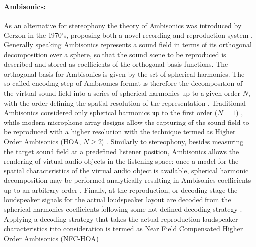 \paragraph{Ambisonics:}
As an alternative for stereophony the theory of Ambisonics was introduced by Gerzon in the 1970's, proposing both a novel recording and reproduction system \cite{gerzon1973periphony}.
Generally speaking Ambisonics represents a sound field in terms of its orthogonal decomposition over a sphere, so that the sound scene to be reproduced is described and stored as coefficients of the orthogonal basis functions.
The orthogonal basis for Ambisonics is given by the set of spherical harmonics.
The so-called encoding step of Ambisonics format is therefore the decomposition of the virtual sound field into a series of spherical harmonics up to a given order $N$, with the order defining the spatial resolution of the representation \cite{gerzon1985ambisonics}.
Traditional Ambisonics considered only spherical harmonics up to the first order ($N = 1$) \cite{gerzon1975the}, while modern microphone array designs allow the capturing of the sound field to be reproduced with a higher resolution with the technique termed as Higher Order Ambisonics (HOA, $N \geq 2$) \cite{5745011, 5744968, 5356221}.
Similarly to stereophony, besides measuring the target sound field at a predefined listener position, Ambisonics allows the rendering of virtual audio objects in the listening space:
once a model for the spatial characteristics of the virtual audio object is available, spherical harmonic decomposition may be performed analytically resulting in Ambisonics coefficients up to an arbitrary order \cite{4517624, Ahrens2010phd}.
Finally, at the reproduction, or decoding stage the loudspeaker signals for the actual loudspeaker layout are decoded from the spherical harmonics coefficients following some not defined decoding strategy \cite{Daniel2000:phd, Daniel2003b}.
Applying a decoding strategy that takes the actual reproduction loudspeaker characteristics into consideration is termed as Near Field Compensated Higher Order Ambisonics (NFC-HOA) \cite{Daniel2003}.

